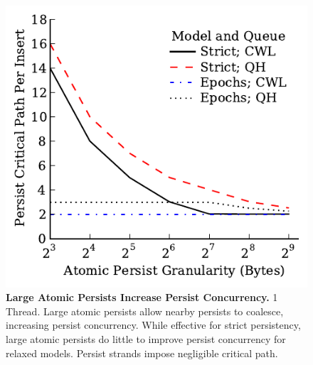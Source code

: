 \begin{figure}
  \centering
  \includegraphics[width=.55\linewidth]{PersistencyEval/Coalescing.pdf}
  \caption{\textbf{Large Atomic Persists Increase Persist Concurrency.} 1 Thread. Large atomic persists allow nearby persists to coalesce, increasing persist concurrency.  While effective for strict persistency, large atomic persists do little to improve persist concurrency for relaxed models.  Persist strands impose negligible critical path.}
  \label{fig::Coalescing}
\end{figure}
